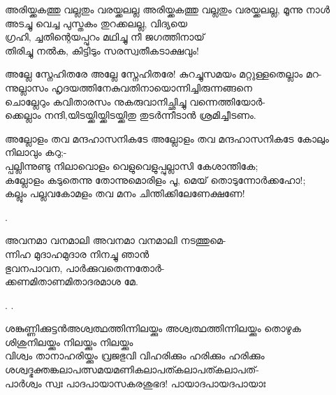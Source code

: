 \begin{enumerate}



\begin{slokam}{\VPc}{\UN}{അരിയ്ക്കകത്തു വല്ലതും വരയ്ക്കലല്ല}
അരിയ്ക്കകത്തു വല്ലതും വരയ്ക്കലല്ല, മൂന്നു നാൾ\\
അടച്ചു വെച്ച പുസ്തകം തുറക്കലല്ല, വിദ്യയെ\\
ഗ്രഹി, ച്ചതിന്റെയപ്പുറം മഥിച്ചു നീ ജഗത്തിനായ്\\
തിരിച്ചു നൽക, കിട്ടിടും സരസ്വതീകടാക്ഷവും!
\end{slokam}


\begin{slokam}{\VSv}{\Unk}{അല്ലേ സ്നേഹിതരേ}
അല്ലേ സ്നേഹിതരേ! കുറച്ചുസമയം മറ്റുള്ളതെല്ലാം മറ-\\
ന്നുല്ലാസം ഹൃദയത്തിനേകുവതിനായൊന്നിച്ചിരുന്നങ്ങനെ\\
ചൊല്ലേറും കവിതാരസം നുകരുവാനിച്ഛിച്ചു വന്നെത്തിയോർ-\\
ക്കെല്ലാം നന്ദി,യിടയ്ക്കിയ്ക്കിടയ്ക്കിതു തുടർന്നീടാൻ ശ്രമിച്ചീടണം.
\end{slokam}



\begin{slokam}{\VSv}{\Unk}{അല്ലോളം തവ മന്ദഹാസനികടേ}
അല്ലോളം തവ മന്ദഹാസനികടേ കോലും നിലാവും കറു;-\\
പ്പല്ലിന്നുണ്ടു നിലാവൊളം വെളുവെളുപ്പുല്ലാസി കേശാന്തികേ;\\
കല്ലോളം കടുതെന്നു തോന്നുമൊരിളം പൂ, മെയ്‌ തൊടുന്നോര്‍ക്കഹോ!;\\
കല്ലും പല്ലവകോമളം തവ മനം ചിന്തിക്കിലേണേക്ഷണേ!
\end{slokam}


.

\begin{slokam}{\VDv}{\VCBP}{അവനമാ വനമാലി}
അവനമാ വനമാലി നടത്തുമെ-\\
ന്നിഹ മുദാഹമുദാര നിനച്ചു ഞാന്‍\\
ഭുവനപാവന, പാര്‍ക്കുവതെന്നതോര്‍-\\
ക്കണമിതാണമിതാദരമാശ മേ.
\end{slokam}


. .




\begin{slokam}{\VSr}{ശങ്കുണ്ണിക്കുട്ടൻ}{അശ്വത്ഥത്തിന്നിലയ്ക്കും}
അശ്വത്ഥത്തിന്നിലയ്ക്കും തൊഴുക ശിശുനിലയ്ക്കും നിലയ്ക്കും നിലയ്ക്കും\\
വിശ്വം താനാഹരിയ്ക്കും വ്രജഭുവി വിഹരിക്കും ഹരിക്കും ഹരിക്കും\\
ശശ്വദ്ഭക്തങ്കലാപത്സമയമണികലാപത്കലാപത്കലാപത്‌-\\
പാർശ്വം സ്വഃ പാദപായാസകരശുഭദ! പായാദപായദപായാഃ
\end{slokam}


\end{enumerate}
